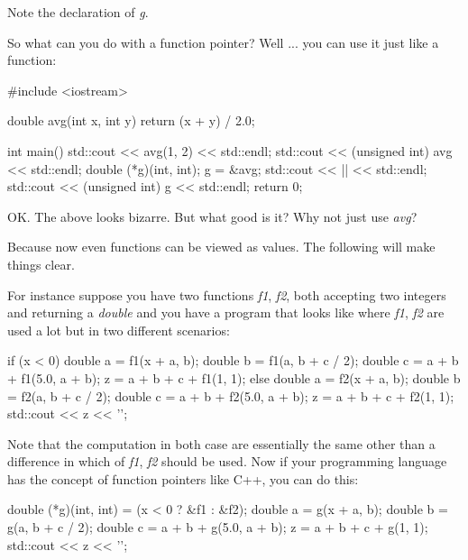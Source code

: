 Note the declaration of \textit{g}.




\newpage{}

So what can you do with a function pointer? Well ... you can use it
just like a function:

\begin{consolethree}[escapeinside=||]
#include <iostream>

double avg(int x, int y)
{
    return (x + y) / 2.0;
}

int main()
{
    std::cout << avg(1, 2) << std::endl;
    std::cout << (unsigned int) avg << std::endl;
    double (*g)(int, int);
    g = &avg;
    std::cout << || << std::endl;
    std::cout << (unsigned int) g << std::endl;
    return 0;
}
\end{consolethree}



\newpage{}

OK. The above looks bizarre. But what good is it? Why not just use
\textit{avg}?

Because now even functions can be viewed as values. The following will
make things clear.

For instance suppose you have two functions \textit{f1}, \textit{f2}, both
accepting two integers and returning a \textit{double} and you have a
program that looks like where \textit{f1}, \textit{f2} are used a lot but in
two different scenarios:

\begin{consolethree}[escapeinside=||]
if (x < 0)
{
    double a = f1(x + a, b);
    double b = f1(a, b + c / 2);
    double c = a + b + f1(5.0, a + b);
    z = a + b + c + f1(1, 1);
}
else
{
    double a = f2(x + a, b);
    double b = f2(a, b + c / 2);
    double c = a + b + f2(5.0, a + b);
    z = a + b + c + f2(1, 1);
}
std::cout << z << '\n';
\end{consolethree}

Note that the computation in both case are essentially the same other
than a difference in which of \textit{f1}, \textit{f2} should be used. Now
if your programming language has the concept of function pointers like
C++, you can do this:

\begin{consolethree}[escapeinside=||]
double (*g)(int, int) = (x < 0 ? &f1 : &f2);
double a = g(x + a, b);
double b = g(a, b + c / 2);
double c = a + b + g(5.0, a + b);
z = a + b + c + g(1, 1);
std::cout << z << '\n';
\end{consolethree}

